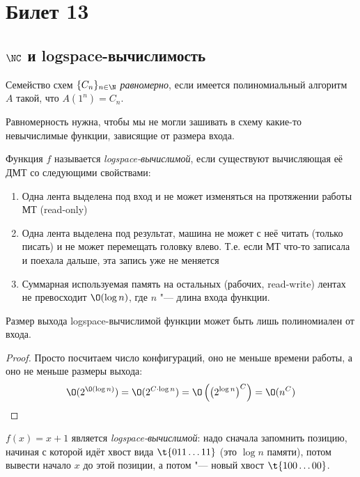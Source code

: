\setcounter{section}{12}
\section{Билет 13}
\subsection[NC и logspace-вычислимость]{$\NC$ и logspace-вычислимость}
	\begin{Def}
		Семейство схем $\{C_n\}_{n\in\N}$ \textit{равномерно}, если имеется полиномиальный алгоритм $A$ такой,
		что $A(1^n)=C_n$.
	\end{Def}
	\begin{Rem}
		Равномерность нужна, чтобы мы не могли зашивать в схему какие-то невычислимые функции, зависящие от размера входа.
	\end{Rem}
	\begin{Def}
		Функция $f$ называется \textit{logspace-вычислимой}, если существуют вычисляющая её ДМТ со следующими свойствами:
		\begin{enumerate}
			\item Одна лента выделена под вход и не может изменяться на протяжении работы МТ (read-only)
			\item
				Одна лента выделена под результат, машина не может с неё читать (только писать) и не может перемещать головку влево.
				Т.е. если МТ что-то записала и поехала дальше, эта запись уже не меняется
			\item Суммарная используемая память на остальных (рабочих, read-write) лентах не превосходит $\O(\log n)$, где $n$ "--- длина входа функции.
		\end{enumerate}
	\end{Def}
	\begin{assertion}
		Размер выхода logspace-вычислимой функции может быть лишь полиномиален от входа.
	\end{assertion}
	\begin{proof}
		Просто посчитаем число конфигураций, оно не меньше времени работы, а оно не меньше размеры выхода:
		\[ \O(2^{\O(\log n)})=\O(2^{C\cdot \log n})=\O\left(\left(2^{\log n}\right)^C\right)=\O(n^C) \]
	\end{proof}
	\begin{exmp}
		$f(x)=x+1$ является \textit{logspace-вычислимой}: надо сначала запомнить позицию, начиная с которой идёт хвост вида $\t{011\dots11}$ (это $\log n$ памяти),
		потом вывести начало $x$ до этой позиции, а потом "--- новый хвост $\t{100\dots00}$.
	\end{exmp}


